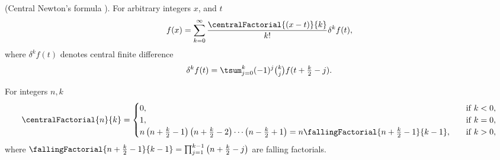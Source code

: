 \begin{proposition}
  {\normalfont
  (Central Newton's formula \cite[p.~462]{butzer1989central}).}
  For arbitrary integers $x$, and $t$
  \label{prop:newtons-interpolation-formula-in-central-differences}
  \begin{align*}
    f(x)
    = \sum_{k=0}^{\infty} \frac{\centralFactorial{(x-t)}{k}}{k!} \delta^{k} f(t),
  \end{align*}
  where $\delta^{k} f(t)$ denotes central finite difference
  \begin{align*}
    \delta^{k} f(t) = \tsum_{j=0}^{k} (-1)^j \tbinom{k}{j} f(t+\tfrac{k}{2} - j).
  \end{align*}
\end{proposition}

\begin{definition}
  \label{def:central-factorials}
  For integers $n,k$
  \begin{align*}
    \centralFactorial{n}{k} =
    \begin{cases}
      0, \quad & \mathrm{if \; } k < 0, \\
      1, \quad & \mathrm{if \; } k = 0, \\
      n \left( n + \frac{k}{2} -1 \right)\left( n + \frac{k}{2} -2 \right)
      \cdots \left( n - \frac{k}{2} +1 \right)
      = n \fallingFactorial{n+\frac{k}{2}-1}{k-1}, \quad & \mathrm{if \; } k>0,
    \end{cases}
  \end{align*}
  where
  $\fallingFactorial{n+\frac{k}{2}-1}{k-1}
  = \prod_{j=1}^{k-1} \left( n + \frac{k}{2} -j \right)$
  are falling factorials.
\end{definition}
